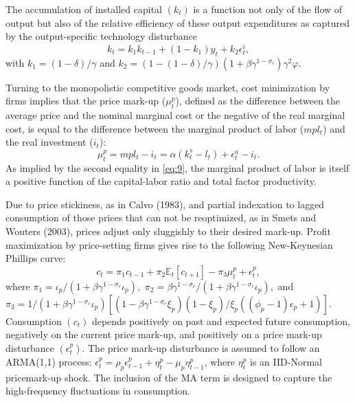 \documentclass[11pt]{article}
\newcommand{\E}{\mathbb{E}}
\newcommand{\iobs}[1]{y_{#1}}
\newcommand{\wobs}[1]{i_{#1}}
\newcommand{\lobs}[1]{l_{#1}}
\newcommand{\piobs}[1]{c_{#1}}
\newcommand{\investment}{output}
\newcommand{\labor}{labor}
\newcommand{\wage}{investment}
\newcommand{\price}{price}
\newcommand{\prices}{prices}
\newcommand{\inflation}{consumption}
\newcommand{\Inflation}{Consumption}
\begin{document}
The accumulation of installed capital \((k_t)\) is a function not only
of the flow of \investment{} but also of the relative efficiency of
these \investment{} expenditures as captured by the \investment-specific
technology disturbance \begin{equation}
  \label{eq:8}
  k_t = k_1 k_{t-1} + (1-k_1) \iobs{t} + k_2 \epsilon_{t}^i,
\end{equation} with \(k_1=(1-\delta)/\gamma\) and
\(k_2 = (1-(1-\delta)/\gamma) (1+ \beta\gamma^{1-\sigma_c})\gamma^2\varphi.\)

Turning to the monopolistic competitive goods market, cost minimization
by firms implies that the price mark-up (\(\mu_t^p\)), defined as the
difference between the average price and the nominal marginal cost or
the negative of the real marginal cost, is equal to the difference
between the marginal product of \labor{} (\(mp\lobs{t}\)) and the real
\wage{} (\(\wobs{t}\)): \begin{equation}
  \label{eq:9}
  \mu_t^p = mp\lobs{t} - \wobs{t} = \alpha(k_t^s - \lobs{t}) +
  \epsilon_t^a - \wobs{t}.
\end{equation} As implied by the second equality in \eqref{eq:9}, the
marginal product of \labor{} is itself a positive function of the
capital-\labor{} ratio and total factor productivity.

Due to \price{} stickiness, as in Calvo (1983), and partial indexation
to lagged \inflation{} of those \prices{} that can not be reoptimized,
as in Smets and Wouters (2003), \prices{} adjust only sluggishly to
their desired mark-up. Profit maximization by \price-setting firms gives
rise to the following New-Keynesian Phillips curve: \begin{equation}
  \label{eq:10}
  \piobs{t} = \pi_1\piobs{t-1} + \pi_2 \E_t[\piobs{t+1}] - \pi_3
  \mu_t^p + \epsilon_t^p,
\end{equation} where
\(\pi_1 = \iota_p / (1+ \beta\gamma^{1-\sigma_c} \iota_p),\)
\(\pi_2 = \beta \gamma^{1-\sigma_c} / (1+\beta \gamma^{1-\sigma_c} \iota_p),\)
and
\(\pi_3 = 1/(1 +\beta \gamma^{1-\sigma_c} \iota_p)[(1- \beta \gamma^{1-\sigma_c} \xi_p)(1-\xi_p) / \xi_p ((\phi_p - 1)\epsilon_p +1)].\)
\Inflation{} \((\piobs{t})\) depends positively on past and expected
future \inflation, negatively on the current \price{} mark-up, and
positively on a \price{} mark-up disturbance \((\epsilon_t^p)\). The
\price{} mark-up disturbance is assumed to follow an ARMA(1,1) process:
\(\epsilon_t^p = \rho_p \epsilon_{t-1}^p + \eta_t^p - \mu_p \eta_{t-1}^p\),
where \(\eta_t^p\) is an IID-Normal \price mark-up shock. The inclusion
of the MA term is designed to capture the high-frequency fluctuations in
\inflation.
\end{document}
